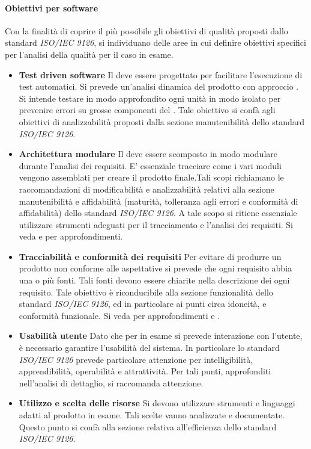 \documentclass[12pt,a4paper]{article}
\begin{document}
\paragraph{Obiettivi per software}
Con la finalità di coprire il più possibile gli obiettivi di qualità proposti dallo standard  \textit{ISO/IEC 9126}, si individuano delle aree in cui definire obiettivi specifici per l'analisi della qualità  per il caso in esame.
\begin{itemize}
	\item{\textbf{Test driven software}}
	Il  deve essere progettato per facilitare l'esecuzione di test automatici. Si prevede un'analisi dinamica del prodotto con approccio . Si intende testare in modo approfondito ogni unità  in modo isolato per prevenire errori su grosse componenti del . Tale obiettivo si confà agli obiettivi di analizzabilità proposti dalla sezione manutenibilità dello standard \textit{ISO/IEC 9126}.
	\item{\textbf{Architettura modulare}}
	Il  deve essere scomposto in modo modulare durante l'analisi dei requisiti. E' essenziale tracciare come i vari moduli vengono assemblati per creare il prodotto finale.Tali scopi richiamano le raccomandazioni di modificabilità e analizzabilità relativi alla sezione manutenibilità e affidabilità (maturità, tolleranza agli errori e conformità di affidabilità) dello standard \textit{ISO/IEC 9126}. A tale scopo si ritiene essenziale utilizzare strumenti adeguati per il tracciamento e l'analisi dei requisiti. Si veda \NdP{} e \AdR{} per approfondimenti.
	\item{\textbf{Tracciabilità e conformità dei requisiti}}
	Per evitare di produrre un prodotto non conforme alle aspettative si prevede che ogni requisito  abbia una o più fonti. Tali fonti devono essere chiarite nella descrizione dei ogni requisito. Tale obiettivo è riconducibile alla sezione funzionalità dello standard  \textit{ISO/IEC 9126}, ed in particolare ai punti circa idoneità, e conformità funzionale. Si veda per approfondimenti \NdP{} e \AdR{}.
	\item{\textbf{Usabilità utente}}
	Dato che per  in esame si prevede interazione con l'utente, è necessario garantire l'usabilità del sistema. In particolare lo standard \textit{ISO/IEC 9126} prevede particolare attenzione per intelligibilità, apprendibilità, operabilità e attrattività. Per tali punti, approfonditi nell'analisi di dettaglio, si raccomanda attenzione.
	\item{\textbf{Utilizzo e scelta delle risorse}}
	Si devono utilizzare strumenti e linguaggi adatti al prodotto in esame. Tali scelte vanno analizzate e documentate. Questo punto si confà alla sezione relativa all'efficienza dello standard \textit{ISO/IEC 9126}.
\end{itemize}
\end{document}
